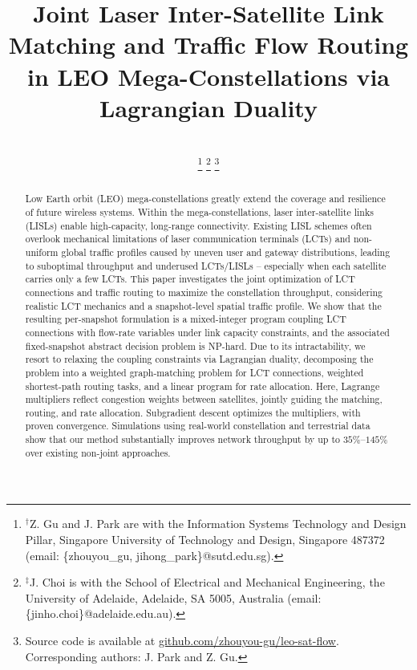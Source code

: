 \documentclass[journal]{IEEEtran}
\begin{document}
\title{\fontsize{21}{28}\selectfont Joint Laser Inter-Satellite Link Matching and Traffic Flow Routing in LEO Mega-Constellations via Lagrangian Duality}

\author{
  \\
\thanks{
$^\dagger$Z. Gu and J. Park are with the Information Systems Technology and Design Pillar, Singapore University of Technology and Design, Singapore 487372 (email: \{zhouyou\_gu, jihong\_park\}@sutd.edu.sg).
}
\thanks{
$^\ddagger$J. Choi is with the School of Electrical and Mechanical Engineering,
the University of Adelaide, Adelaide, SA 5005, Australia
(email: \{jinho.choi\}@adelaide.edu.au).
}%
\thanks{Source code is available at \url{github.com/zhouyou-gu/leo-sat-flow}. Corresponding authors: J. Park and Z. Gu.}
\vspace{-0.75cm}
}

\maketitle

\begin{abstract}
Low Earth orbit (LEO) mega-constellations greatly extend the coverage and resilience of future wireless systems. Within the mega-constellations, laser inter-satellite links (LISLs) enable high-capacity, long-range connectivity. Existing LISL schemes often overlook mechanical limitations of laser communication terminals (LCTs) and non-uniform global traffic profiles caused by uneven user and gateway distributions, leading to suboptimal throughput and underused LCTs/LISLs -- especially when each satellite carries only a few LCTs. This paper investigates the joint optimization of LCT connections and traffic routing to maximize the constellation throughput, considering realistic LCT mechanics and a snapshot-level spatial traffic profile. We show that the resulting per-snapshot formulation is a mixed-integer program coupling LCT connections with flow-rate variables under link capacity constraints, and the associated fixed-snapshot abstract decision problem is NP-hard. Due to its intractability, we resort to relaxing the coupling constraints via Lagrangian duality, decomposing the problem into a weighted graph-matching problem for LCT connections, weighted shortest-path routing tasks, and a linear program for rate allocation. Here, Lagrange multipliers reflect congestion weights between satellites, jointly guiding the matching, routing, and rate allocation. Subgradient descent optimizes the multipliers, with proven convergence. Simulations using real-world constellation and terrestrial data show that our method substantially improves network throughput by up to $35\%$--$145\%$ over existing non-joint approaches.
\end{abstract}
\end{document}
